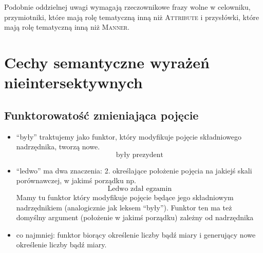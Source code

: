 \documentclass[a4paper, 12pt]{article}
\theoremstyle{remark}
\begin{document}
Podobnie oddzielnej uwagi wymagają rzeczownikowe frazy wolne w celowniku,
przymiotniki, które mają rolę tematyczną inną niż \textsc{Attribute}
i przysłówki, które mają rolę tematyczną inną niż \textsc{Manner}.

\section{Cechy semantyczne wyrażeń nieintersektywnych}

\subsection{Funktorowatość zmieniająca pojęcie}
\begin{itemize}
\item ``były'' traktujemy jako funktor, który modyfikuje pojęcie składniowego nadrzędnika, tworzą nowe.
\begin{equation}
	\text{były prezydent}
\end{equation}
\item ``ledwo'' ma dwa znaczenia:
2. określające położenie pojęcia na jakiejś skali porównawczej, w jakimś porządku np.
\begin{equation}
	\text{Ledwo zdał egzamin}
\end{equation}
Mamy tu funktor który modyfikuje pojęcie będące jego składniowym nadrzędnikiem (analogicznie jak leksem ``były'').
Funktor ten ma też domyślny argument (położenie w jakimś porządku) zależny od nadrzędnika

\item co najmniej: funktor biorący określenie liczby bądź miary i generujący nowe określenie liczby bądź miary.

\end{itemize}
\end{document}
